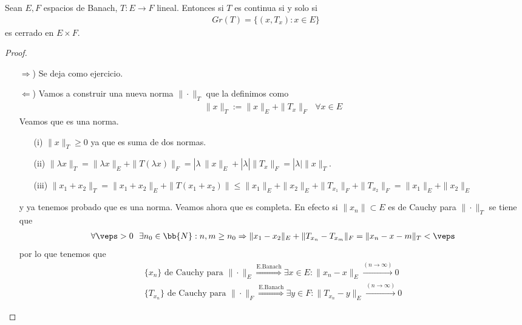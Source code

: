 \begin{teo}
    Sean $E,F$ espacios de Banach, $T:E\to F$ lineal. Entonces si $T$ es continua si y solo si
    \begin{gather*}
        Gr(T) = \{(x,T_x):x\in E\}
    \end{gather*}
    es cerrado en $E\times F$.

    \begin{proof}\
        \begin{itemize}
            \item[$\Rightarrow$)] Se deja como ejercicio.
            \item[$\Leftarrow$)] Vamos a construir una nueva norma $\|\cdot\|_T$ que la definimos como 
            \begin{gather*}
                \|x\|_T := \|x\|_E + \|T_x\|_F\ \ \ \forall x \in E
            \end{gather*}
            Veamos que es una norma.
            \begin{enumerate}
                \item[(i)] $\|x\|_T \geq 0$ ya que es suma de dos normas.
                \item[(ii)] $\|\lambda x\|_T = \|\lambda x\|_E + \|T(\lambda x)\|_F = |\lambda\ \|x\|_E + |\lambda| \|T_x\|_F = |\lambda| \|x\|_T$.
                \item[(iii)] $\|x_1+x_2\|_T = \|x_1+x_2\|_E + \|T(x_1+x_2)\| \leq \|x_1\|_E + \|x_2\|_E + \|T_{x_1}\|_F + \|T_{x_2}\|_F = \|x_1\|_E + \|x_2\|_E$ 
            \end{enumerate}
            y ya tenemos probado que es una norma. Veamos ahora que es completa. En efecto si $\|x_n\|\subset E$ es de Cauchy para $\|\cdot\|_T$ se tiene que 
            \begin{gather*}
                \forall \veps > 0\ \ \exists n_0\in \bb{N}: n,m\geq n_0 \Rightarrow \|x_1-x_2\|_E + \|T_{x_n}-T_{x_m}\|_F = \|x_n-x-m\|_T < \veps
            \end{gather*}
            por lo que tenemos que 
            \begin{gather*}
                \{x_n\} \text{ de Cauchy para } \|\cdot\|_E \overset{\text{E.Banach}}{\Longrightarrow} \exists x\in E : \|x_n-x\|_E \overset{(n\to \infty)}{\longrightarrow} 0\\
                \{T_{x_n}\} \text{ de Cauchy para } \|\cdot\|_F \overset{\text{E.Banach}}{\Longrightarrow} \exists y\in F : \|T_{x_n} -y\|_E \overset{(n\to \infty)}{\longrightarrow} 0
            \end{gather*}


\end{itemize}
\end{proof}
\end{teo}
